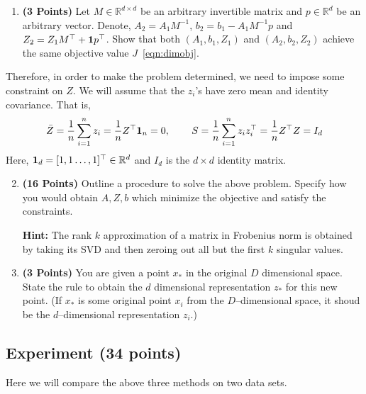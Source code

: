 \documentclass[a4paper]{article}
\newcommand*{\one}{{\bf 1}}
\newcommand{\Zbar}{\bar{Z}}
\theoremstyle{definition}
\newcommand{\RR}{\mathbb{R}}
\begin{document}
\begin{enumerate}
	\item \textbf{(3 Points)}
	      Let $M\in\RR^{d\times d}$ be an arbitrary invertible matrix and $p\in\RR^{d}$ be an arbitrary vector.
	      Denote, $A_2 = A_1M^{-1}$, $b_2 = b_1- A_1M^{-1}p$ and $Z_2 = Z_1 M^\top +
		      \one p^\top$.
	      Show that both
	      $(A_1, b_1, Z_1)$ and $(A_2, b_2, Z_2)$ achieve the same objective value $J$~\eqref{eqn:dimobj}.
\end{enumerate}

Therefore, in order to make the problem determined, we need to impose some
constraint on $Z$. We will assume that the $z_i$'s have zero mean and identity covariance.
That is,
\begin{align*}
	\Zbar = \frac{1}{n} \sum_{i=1}^n z_i =\frac{1}{n} Z^\top {\bf 1}_n = 0, \hspace{0.3in}
	S = \frac{1}{n} \sum_{i=1}^n z_i z_i^\top
	= \frac{1}{n} Z^\top Z
	= I_d
\end{align*}
Here, ${\bf 1}_d = [1, 1 \dots, 1]^\top \in\RR^d$ and $I_d$  is the $d\times d$ identity matrix.

\begin{enumerate}
	\setcounter{enumi}{1}
	\item \textbf{(16 Points)}
	      Outline a procedure to solve the above problem. Specify how you
	      would obtain $A, Z, b$ which minimize the objective and satisfy the constraints.

	      \textbf{Hint: }The rank $k$ approximation of a matrix in Frobenius norm is obtained by
	      taking its SVD and then zeroing out all but the first $k$ singular values.

	\item \textbf{(3 Points)}
	      You are given a point $x_*$ in the original $D$ dimensional space.
	      State the rule to obtain the $d$ dimensional
	      representation $z_*$ for this new point.
	      (If $x_*$ is some original point $x_i$ from the $D$--dimensional space, it shoud be the
	      $d$--dimensional representation $z_i$.)


\end{enumerate}


\subsection{Experiment (34 points)}

Here we will compare the above three methods on two data sets.
\end{document}
